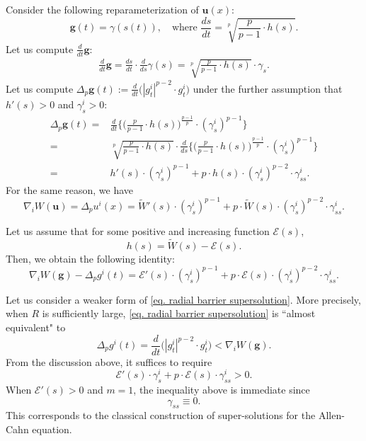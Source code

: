 \documentclass[11pt,twoside,reqno]{amsart}
\newcounter{assu}
\numberwithin{equation}{section}
\begin{document}
Consider the following reparameterization of $\mathbf{u}(x)$:
\begin{equation*}
    \mathbf{g}(t)=\gamma(s(t)),\quad\mbox{where }\frac{ds}{dt}=\sqrt[p]{\frac{p}{p-1}\cdot h(s)}.
\end{equation*}
Let us compute $\frac{d}{dt}\mathbf{g}$:
\begin{align*}
    \frac{d}{dt}\mathbf{g}=\frac{ds}{dt}\cdot\frac{d}{ds}\gamma(s)=\sqrt[p]{\frac{p}{p-1}\cdot h(s)}\cdot\gamma_{s}.
\end{align*}
Let us compute $\Delta_{p}\mathbf{g}(t):=\frac{d}{dt}\Big(|g^{i}_{t}|^{p-2}\cdot g^{i}_{t}\Big)$ under the further assumption that $h'(s)>0$ and $\gamma^{i}_{s}>0$:
\begin{align*}
    \Delta_{p}\mathbf{g}(t)=&\frac{d}{dt}\Big\{\Big(\frac{p}{p-1}\cdot h(s)\Big)^{\frac{p-1}{p}}\cdot(\gamma^{i}_{s})^{p-1}\Big\}\\
    =&\sqrt[p]{\frac{p}{p-1}\cdot h(s)}\cdot\frac{d}{ds}\Big\{\Big(\frac{p}{p-1}\cdot h(s)\Big)^{\frac{p-1}{p}}\cdot(\gamma^{i}_{s})^{p-1}\Big\}\\
    =&h'(s)\cdot(\gamma^{i}_{s})^{p-1}+p\cdot h(s)\cdot(\gamma^{i}_{s})^{p-2}\cdot\gamma^{i}_{ss}.
\end{align*}
For the same reason, we have
\begin{equation*}
    \nabla_{i}W(\mathbf{u})=\Delta_{p}u^{i}(x)=\widetilde{W}'(s)\cdot(\gamma^{i}_{s})^{p-1}+p\cdot\widetilde{W}(s)\cdot(\gamma^{i}_{s})^{p-2}\cdot\gamma^{i}_{ss}.
\end{equation*}

Let us assume that for some positive and increasing function $\mathcal{E}(s)$,
\begin{equation*}
    h(s)=\widetilde{W}(s)-\mathcal{E}(s).
\end{equation*}
Then, we obtain the following identity:
\begin{equation*}
    \nabla_{i}W(\mathbf{g})-\Delta_{p}g^{i}(t)=\mathcal{E}'(s)\cdot(\gamma^{i}_{s})^{p-1}+p\cdot\mathcal{E}(s)\cdot(\gamma^{i}_{s})^{p-2}\cdot\gamma^{i}_{ss}.
\end{equation*}

Let us consider a weaker form of \eqref{eq. radial barrier supersolution}. More precisely, when $R$ is sufficiently large, \eqref{eq. radial barrier supersolution} is ``almost equivalent" to
\begin{equation*}
    \Delta_{p}g^{i}(t)=\frac{d}{dt}\Big(|g^{i}_{t}|^{p-2}\cdot g^{i}_{t}\Big)<\nabla_{i}W(\mathbf{g}).
\end{equation*}
From the discussion above, it suffices to require
\begin{equation}\label{eq. why curvature is important}
    \mathcal{E}'(s)\cdot\gamma^{i}_{s}+p\cdot\mathcal{E}(s)\cdot\gamma^{i}_{ss}>0.
\end{equation}
When $\mathcal{E}'(s)>0$ and $m=1$, the inequality above is immediate since  $$ \gamma_{ss}\equiv0.$$ 
This corresponds to the classical construction of super-solutions for the Allen-Cahn equation. 
\end{document}
